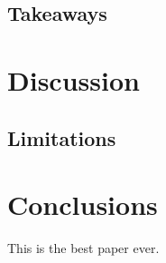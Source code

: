 \documentclass[
  authoryear,
  review,
  1p]{elsarticle}
\begin{document}
\subsection{Takeaways}\label{takeaways}

\section{Discussion}\label{sec-discussion}

\subsection{Limitations}\label{sec-limitations}

\section{Conclusions}\label{sec-conclusions}

This is the best paper ever.


\renewcommand\refname{References}

\end{document}
